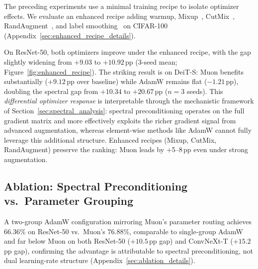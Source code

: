 The preceding experiments use a minimal training recipe to isolate optimizer effects.
We evaluate an enhanced recipe adding warmup, Mixup~\cite{zhang2018mixup}, CutMix~\cite{yun2019cutmix}, RandAugment~\cite{cubuk2020randaugment}, and label smoothing~\cite{szegedy2016rethinking} on CIFAR-100 (Appendix~\ref{sec:enhanced_recipe_details}).

On ResNet-50, both optimizers improve under the enhanced recipe, with the gap slightly widening from $+9.03$ to $+10.92$\,pp (3-seed mean; Figure~\ref{fig:enhanced_recipe}).
The striking result is on DeiT-S: Muon benefits substantially ($+9.12$\,pp over baseline) while AdamW remains flat ($-1.21$\,pp), doubling the spectral gap from $+10.34$ to $+20.67$\,pp ($n{=}3$ seeds).
This \emph{differential optimizer response} is interpretable through the mechanistic framework of Section~\ref{sec:spectral_analysis}: spectral preconditioning operates on the full gradient matrix and more effectively exploits the richer gradient signal from advanced augmentation, whereas element-wise methods like AdamW cannot fully leverage this additional structure. Enhanced recipes (Mixup, CutMix, RandAugment) preserve the ranking: Muon leads by +5--8\,pp even under strong augmentation.

\vspace{-0.5em}
\subsection{Ablation: Spectral Preconditioning vs.\ Parameter Grouping}
\label{sec:ablation}

A two-group AdamW configuration mirroring Muon's parameter routing achieves $66.36\%$ on ResNet-50 vs.\ Muon's $76.88\%$, comparable to single-group AdamW and far below Muon on both ResNet-50 ($+10.5$\,pp gap) and ConvNeXt-T ($+15.2$\,pp gap), confirming the advantage is attributable to spectral preconditioning, not dual learning-rate structure (Appendix~\ref{sec:ablation_details}).